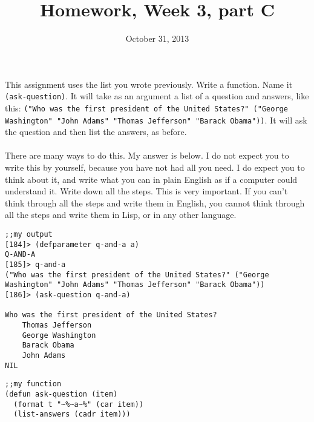 \documentclass{article}
\title{Homework, Week 3, part C}
\date{October 31, 2013}
\begin{document}
\maketitle{}

\paragraph{}This assignment uses the list you wrote previously. Write a function. Name it \texttt{(ask-question)}. It will take as an argument a list of a question and answers, like this: \texttt{("Who was the first president of the United States?" ("George Washington" "John Adams" "Thomas Jefferson" "Barack Obama"))}. It will ask the question and then list the answers, as before.

\paragraph{}There are many ways to do this. My answer is below. I do not expect you to write this by yourself, because you have not had all you need. I do expect you to think about it, and write what you can in plain English as if a computer could understand it. Write down all the steps. This is very important. If you can't think through all the steps and write them in English, you cannot think through all the steps and write them in Lisp, or in any other language.

\lstset{language=Lisp,numbers=left,keepspaces=false,basicstyle=\small,numberstyle=\tiny,breaklines=true,showstringspaces=false}
\begin{lstlisting}
;;my output
[184]> (defparameter q-and-a a)
Q-AND-A
[185]> q-and-a
("Who was the first president of the United States?" ("George Washington" "John Adams" "Thomas Jefferson" "Barack Obama"))
[186]> (ask-question q-and-a)

Who was the first president of the United States?
    Thomas Jefferson
    George Washington
    Barack Obama
    John Adams
NIL
\end{lstlisting}

\lstset{language=Lisp,numbers=left,keepspaces=false,basicstyle=\small,numberstyle=\tiny,breaklines=true,showstringspaces=false}
\begin{lstlisting}
;;my function
(defun ask-question (item)
  (format t "~%~a~%" (car item))
  (list-answers (cadr item)))
\end{lstlisting}
\end{document}
